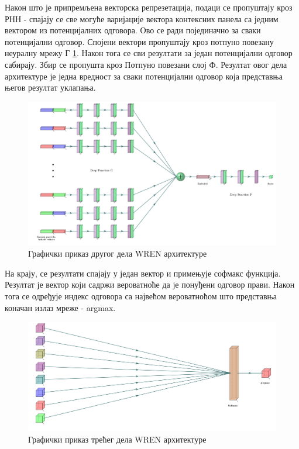 \documentclass[a4paper, 12pt, master, utf8]{etf}
\begin{document}
Након што је припремљена векторска репрезетација, подаци се пропуштају кроз РНН - спајају се све могуће варијације вектора контексних панела са једним вектором из потенцијалних одговора. Ово се ради појединачно за сваки потенцијални одговор. 
Спојени вектори пропуштају кроз потпуно повезану неуралну мрежу Г \ref{fig:wren2}. Након тога се сви резултати за један потенцијални одговор сабирају.
Збир се пропушта кроз Потпуно повезани слој Ф. Резултат овог дела архитектуре је једна вредност за сваки потенцијални одговор која представња његов резултат уклапања. 
\newline

\begin{figure}[H]
    \centering
    \includegraphics[width=\textwidth]{arhitekture/wren2.pdf}
    \caption{Графички приказ другог дела WREN архитектуре}
    \label{fig:wren2}
\end{figure}

На крају, се резултати спајају у један вектор и примењује софмакс функција. Резултат је вектор који садржи вероватноће да је понуђени одговор прави. Након тога се одређује индекс одговора са највећом вероватноћом што представња коначан излаз мреже - argmax.
\newline

\begin{figure}[H]
    \centering
    \includegraphics[width=\textwidth]{arhitekture/wren3.pdf}
    \caption{Графички приказ трећег дела WREN архитектуре}
    \label{fig:wren3}
\end{figure}
\end{document}
